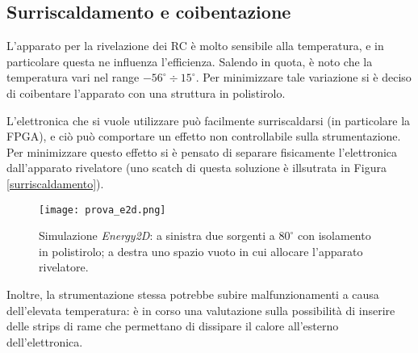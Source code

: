 \subsection*{Surriscaldamento e coibentazione}
L'apparato per la rivelazione dei RC è molto sensibile alla temperatura, e in particolare questa ne influenza l'efficienza. Salendo in quota, è noto che la temperatura vari nel range $-56^{\circ} \div 15^{\circ}$. Per minimizzare tale variazione si è deciso di coibentare l'apparato con una struttura in polistirolo.

L'elettronica che si vuole utilizzare può facilmente surriscaldarsi (in particolare la FPGA), e ciò può comportare un effetto non controllabile sulla strumentazione. Per minimizzare questo effetto si è pensato di separare fisicamente l'elettronica dall'apparato rivelatore (uno scatch di questa soluzione è illsutrata in Figura \ref{surriscaldamento}).

\begin{figure}
    \centering
    \texttt{[image: prova\_e2d.png]}
    \caption{Simulazione \textit{Energy2D}\citep{surriscaldamento}: a sinistra due sorgenti a $80^{\circ}$ con isolamento in polistirolo; a destra uno spazio vuoto in cui allocare l'apparato rivelatore.}
\end{figure}
Inoltre, la strumentazione stessa potrebbe subire malfunzionamenti a causa dell'elevata temperatura: è in corso una valutazione sulla possibilità di inserire delle strips di rame che permettano di dissipare il calore all'esterno dell'elettronica.

